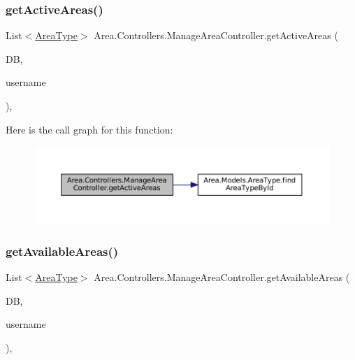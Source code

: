 \subsubsection{\texorpdfstring{get\+Active\+Areas()}{getActiveAreas()}}
{\footnotesize\ttfamily List$<$\mbox{\hyperlink{classArea_1_1Models_1_1AreaType}{Area\+Type}}$>$ Area.\+Controllers.\+Manage\+Area\+Controller.\+get\+Active\+Areas (\begin{DoxyParamCaption}\item[{\mbox{\hyperlink{classArea_1_1DAT_1_1AreaDbContext}{Area\+Db\+Context}}}]{DB,  }\item[{string}]{username }\end{DoxyParamCaption})\hspace{0.3cm}{\ttfamily [inline]}, {\ttfamily [private]}}

Here is the call graph for this function\+:
\nopagebreak
\begin{figure}[H]
\begin{center}
\leavevmode
\includegraphics[width=350pt]{classArea_1_1Controllers_1_1ManageAreaController_af30cf6d59cf0ce70de54adc3f706da0b_cgraph}
\end{center}
\end{figure}
\mbox{\label{classArea_1_1Controllers_1_1ManageAreaController_a04c1155798ffbfc4f87564fe48db8981}} 
\subsubsection{\texorpdfstring{get\+Available\+Areas()}{getAvailableAreas()}}
{\footnotesize\ttfamily List$<$\mbox{\hyperlink{classArea_1_1Models_1_1AreaType}{Area\+Type}}$>$ Area.\+Controllers.\+Manage\+Area\+Controller.\+get\+Available\+Areas (\begin{DoxyParamCaption}\item[{\mbox{\hyperlink{classArea_1_1DAT_1_1AreaDbContext}{Area\+Db\+Context}}}]{DB,  }\item[{string}]{username }\end{DoxyParamCaption})\hspace{0.3cm}{\ttfamily [inline]}, {\ttfamily [private]}}

